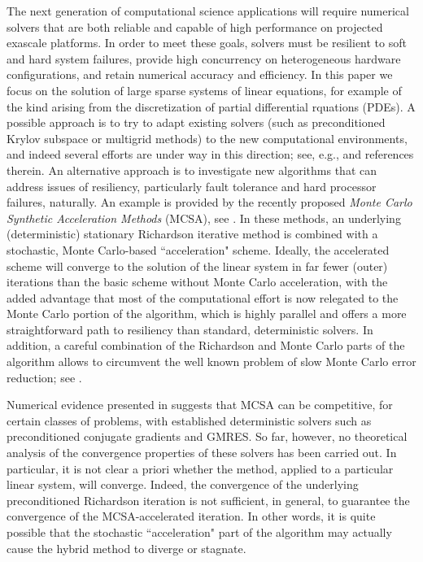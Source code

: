 \documentclass[final,leqno,onefignum,onetabnum]{siamltex1213}
\begin{document}
The next generation of computational science applications will require numerical
solvers that are both reliable and capable of high performance on projected exascale
platforms. In order to meet these goals, solvers must be resilient to soft and hard
system failures, provide high concurrency on heterogeneous hardware configurations,
and retain numerical accuracy and efficiency. In this paper we focus on the
solution of large sparse systems of linear equations, for
example of the kind arising from the discretization of partial differential
rquations (PDEs).  A possible approach is to try to adapt existing solvers
(such as preconditioned Krylov subspace or multigrid methods) to the new
computational environments, and indeed several efforts are under way in this
direction; see, e.g., \cite{Agullo,FLRU15,Heroux,Rizzi,Stoyanov} and references therein.
An alternative approach is to investigate
new algorithms that can address issues of resiliency, particularly fault
tolerance and hard processor failures, naturally. An example is provided
by the recently proposed {\em Monte Carlo Synthetic Acceleration Methods}
(MCSA), see \cite{EMSH2014,Slattery2013}.
In these methods, an underlying (deterministic) stationary Richardson iterative
method is combined with a stochastic, Monte Carlo-based ``acceleration" scheme.
Ideally, the accelerated scheme will converge to the solution of the linear
system in far fewer (outer) iterations than the basic scheme without Monte Carlo
acceleration, with the added advantage that most of the computational effort
is now relegated to the Monte Carlo portion of the algorithm, which is
highly parallel and offers a more straightforward path to resiliency
than standard, deterministic solvers. In addition,
a careful combination of the Richardson
and Monte Carlo parts of the algorithm allows to circumvent the well known
problem of slow Monte Carlo error reduction; see \cite{EMSH2014}.

Numerical evidence presented in \cite{EMSH2014} suggests
that MCSA can be competitive, for certain classes of problems,
with established deterministic solvers such as preconditioned
conjugate gradients and GMRES. So far, however, no theoretical analysis
of the convergence properties of these solvers has been carried out. In
particular, it is not clear a priori whether the method, applied to a
particular linear system, will converge.
Indeed, the convergence of the underlying preconditioned Richardson
iteration is not sufficient, in general, to guarantee the convergence
of the MCSA-accelerated iteration. In other words, it is quite possible
that the stochastic ``acceleration" part of the algorithm may actually
cause the hybrid method to diverge or stagnate.
\end{document}
